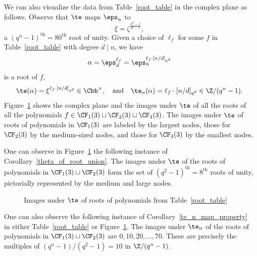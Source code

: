 \begin{example}
We can also visualize the data from Table~\ref{root_table} in the complex plane as follows.
Observe that \(\te\) maps \(\eps_n\) to
\[
\xi = \zeta^{\frac{q^{n!}-1}{q^n-1}},
\]
a \((q^n-1)^\text{th} = 80^\text{th}\) root of unity.
Given a choice of \(\ell_f\) for some \(f\) in Table~\ref{root_table} with degree \(d \mid n\), we have
\[
\alpha
=
\eps_d^{\ell_f}
=
\eps_n^{\ell_f \cdot [n/d]_{q^d}}
\]
is a root of \(f\),
\[
\te (\alpha) = \xi^{\ell_f \cdot [n/d]_{q^d}} \in \Cbb^\times,
\quad
\text{and}
\quad
\te_n (\alpha) = \ell_f \cdot [n/d]_{q^d} \in \Z / (q^n-1).
\]
Figure~\ref{root_picture} shows the complex plane and the images under \(\te\) of all the roots of all the polynomials \(f \in \CF_1 (3) \sqcup \CF_2 (3) \sqcup \CF_4 (3)\).
The images under \(\te\) of roots of polynomials in \(\CF_1 (3)\) are labeled by the largest nodes, those for \(\CF_2 (3)\) by the medium-sized nodes, and those for \(\CF_4 (3)\) by the smallest nodes.

One can observe in Figure~\ref{root_picture} the following instance of Corollary~\ref{theta_of_root_union}.
The images under \(\te\) of the roots of polynomials in \(\CF_1 (3) \sqcup \CF_2 (3)\) form the set of \((q^2-1)^\text{th} = 8^\text{th}\) roots of unity, pictorially represented by the medium and large nodes.

\begin{figure}
\caption{Images under \(\te\) of roots of polynomials from Table~\ref{root_table}}
\centering
{}
\label{root_picture}
\end{figure}

One can also observe the following instance of Corollary~\ref{te_n_map_property} in either Table~\ref{root_table} or Figure~\ref{root_picture}.
The images under \(\te_n\) of the roots of polynomials in \(\CF_1 (3) \sqcup \CF_2 (3)\) are \(0, 10, 20, \ldots, 70\).
These are precisely the multiples of \((q^n-1)/(q^2-1) = 10\) in \(\Z / (q^n-1)\).
\end{example}
